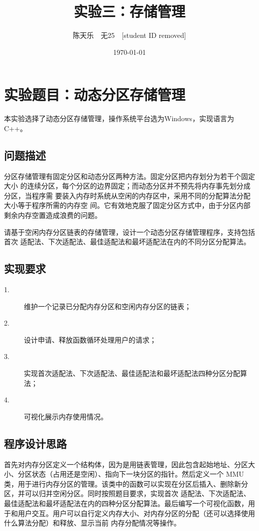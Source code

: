 \documentclass[UTF8]{ctexart}
\title{\textbf{实验三：存储管理}}
\author{陈天乐\ \ 无25\ \ [student ID removed] }
\date{\today}
\begin{document}
\maketitle
\tableofcontents
\newpage

\section{实验题目：动态分区存储管理}
本实验选择了动态分区存储管理，操作系统平台选为Windows，实现语言为C++。

\subsection{问题描述}
分区存储管理有固定分区和动态分区两种方法。固定分区把内存划分为若干个固定大小
的连续分区，每个分区的边界固定；而动态分区并不预先将内存事先划分成分区，当程序需
要装入内存时系统从空闲的内存区中，采用不同的分配算法分配大小等于程序所需的内存空
间。它有效地克服了固定分区方式中，由于分区内部剩余内存空置造成浪费的问题。

请基于空闲内存分区链表的存储管理，设计一个动态分区存储管理程序，支持包括首次
适配法、下次适配法、最佳适配法和最坏适配法在内的不同分区分配算法。

\subsection{实现要求}
\begin{description}
    \item[1.] 维护一个记录已分配内存分区和空闲内存分区的链表；
    \item[2.] 设计申请、释放函数循环处理用户的请求；
    \item[3.] 实现首次适配法、下次适配法、最佳适配法和最坏适配法四种分区分配算法；
    \item[4.] 可视化展示内存使用情况。
\end{description}


\subsection{程序设计思路}
首先对内存分区定义一个结构体，因为是用链表管理，因此包含起始地址、分区大小、分区状态（占用还是空闲）、指向下一块分区的指针。然后定义一个
MMU类，用于进行内存分区的管理。该类中的函数可以实现在分区后插入、删除新分区，并可以归并空闲分区。同时按照题目要求，实现首次
适配法、下次适配法、最佳适配法和最坏适配法在内的四种分区分配算法。最后编写一个可视化函数，用于和用户交互。用户可以自行定义内存大小、对内存分区的分配（还可以选择使用什么算法分配）和释放、显示当前
内存分配情况等操作。
\end{document}

